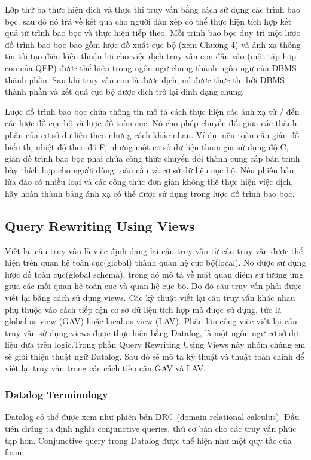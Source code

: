 \documentclass[a4paper]{article}
\begin{document}
Lớp thứ ba thực hiện dịch và thực thi truy vấn bằng cách sử dụng các trình bao bọc. sau đó
nó trả về kết quả cho người dàn xếp có thể thực hiện tích hợp kết quả từ
trình bao bọc và thực hiện tiếp theo. Mỗi trình bao bọc duy trì một lược đồ trình bao bọc
bao gồm lược đồ xuất cục bộ (xem Chương 4) và ánh xạ thông tin tới
tạo điều kiện thuận lợi cho việc dịch truy vấn con đầu vào (một tập hợp con của QEP) được thể hiện trong
ngôn ngữ chung thành ngôn ngữ của DBMS thành phần. Sau khi truy vấn con là
được dịch, nó được thực thi bởi DBMS thành phần và kết quả cục bộ được dịch
trở lại định dạng chung.

Lược đồ trình bao bọc chứa thông tin mô tả cách thực hiện các ánh xạ từ / đến các lược đồ cục bộ và lược đồ toàn cục. Nó cho phép chuyển đổi
giữa các thành phần của cơ sở dữ liệu theo những cách khác nhau. Ví dụ: nếu toàn cầu
giản đồ biểu thị nhiệt độ theo độ F, nhưng một cơ sở dữ liệu tham gia
sử dụng độ C, giản đồ trình bao bọc phải chứa công thức chuyển đổi thành
cung cấp bản trình bày thích hợp cho người dùng toàn cầu và cơ sở dữ liệu cục bộ. Nếu phiên bản lừa đảo có nhiều loại và các công thức đơn giản không thể thực hiện việc dịch, hãy hoàn thành
bảng ánh xạ có thể được sử dụng trong lược đồ trình bao bọc.

\subsection{Query Rewriting Using Views}
Viết lại câu truy vấn là việc định dạng lại câu truy vấn từ câu truy vấn được thể hiện trên quan hệ toàn cục(global) thành quan hệ cục bộ(local). Nó được sử dụng lược đồ toàn cục(global schema), trong đó mô tả về mặt quan điẻm sự tương ứng giữa các mối quan hệ toàn cục và quan hệ cục bộ. Do đó câu truy vấn phải được viết lại bằng cách sử dụng views. Các kỹ thuật viết lại câu truy vấn khác nhau phụ thuộc vào cách tiếp cận cơ sở dữ liệu tích hợp mà được sử dụng, tức là global-as-view (GAV) hoặc local-as-view (LAV). Phần lớn công việc viết lại câu truy vấn sử dụng views được thực hiện bằng Datalog, là một ngôn ngữ cơ sở dữ liệu dựa trên logic.Trong phần Query Rewriting Using Views này nhóm chúng em sẽ giới thiệu thuật ngữ Datalog. Sau đó sẽ mô tả kỹ thuật và thuật toán chính để viết lại truy vấn trong các cách tiếp cận GAV và LAV.
\subsubsection{Datalog Terminology}
Datalog có thể được xem như phiên bản DRC (domain relational calculus). Đầu tiên chúng ta định nghĩa conjunctive queries, thứ cơ bản cho các truy vấn phức tạp hơn. Conjunctive query trong Datalog được thể hiện như một quy tắc của form:
\end{document}

